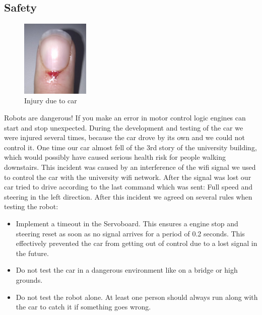 \documentclass[a4paper
               ,10pt
               ,DIV=10 %
               ,BCOR=0.3cm
               ,pagesize %
               ,headings=small
               ,bibtotoc
               ]
               {scrartcl}
\begin{document}
\subsection{Safety}
\begin{figure}
\includegraphics[width=0.29\textwidth]{pic/finger.png}
\caption{Injury due to car}
\label{figinjury}
\end{figure}
Robots are dangerous! If you make an error in motor control logic engines can start and stop unexpected. During the development and testing of the car we were injured several times, because the car drove by its own and we could not control it. One time our car almost fell of the 3rd story of the university building, which would possibly have caused serious health risk for people walking downstairs. This incident was caused by an interference of the wifi signal we used to control the car with the university wifi network. After the signal was lost our car tried to drive according to the last command which was sent: Full speed and steering in the left direction. After this incident we agreed on several rules when testing the robot:
\begin{itemize}
  \item Implement a timeout in the Servoboard. This ensures a engine stop and steering reset as soon as no signal arrives for a period of 0.2 seconds. This effectively prevented the car from getting out of control due to a lost signal in the future.
  \item Do not test the car in a dangerous environment like on a bridge or high grounds.
  \item Do not test the robot alone. At least one person should always run along with the car to catch it if something goes wrong.
\end{itemize}
\end{document}
